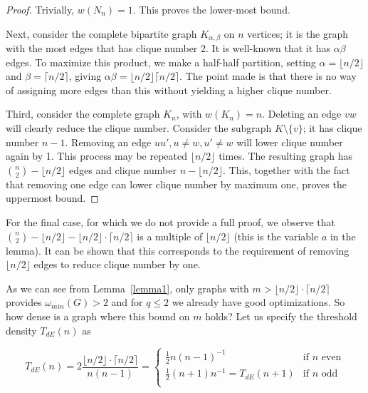\documentclass[a4paper]{article}
\begin{document}

\begin{proof}
 Trivially, $w(N_n) = 1$. This proves the lower-most bound.
 
 Next, consider the complete bipartite graph $K_{\alpha,\beta}$ on $n$ vertices; it is the graph with the most edges that has clique number 2. It is well-known that it has $\alpha \beta$ edges. To maximize this product, we make a half-half partition, setting $\alpha = \lfloor n / 2 \rfloor$ and $\beta = \lceil n / 2 \rceil$, giving $\alpha \beta = \lfloor n / 2 \rfloor \lceil n / 2 \rceil$. The point made is that there is no way of assigning more edges than this without yielding a higher clique number.
 
 Third, consider the complete graph $K_n$, with $w(K_n) = n$. Deleting an edge $vw$ will clearly reduce the clique number. Consider the subgraph $K \setminus \{v\}$; it has clique number $n - 1$. Removing an edge $uu', u \neq w, u' \neq w$ will lower clique number again by 1. This process may be repeated $\lfloor n / 2 \rfloor$ times. The resulting graph has $\binom{n}{2} - \lfloor n/2 \rfloor$ edges and clique number $n - \lfloor n/2 \rfloor$. This, together with the fact that removing one edge can lower clique number by maximum one, proves the uppermost bound. 
\end{proof}

For the final case, for which we do not provide a full proof, we observe that $\binom{n}{2} - \lfloor n/2 \rfloor - \lfloor n / 2 \rfloor \cdot \lceil n / 2 \rceil$ is a multiple of $\lfloor n/2 \rfloor$ (this is the variable $a$ in the lemma). It can be shown that this corresponds to the requirement of removing $\lfloor n/2 \rfloor$ edges to reduce clique number by one.

As we can see from Lemma~\ref{lemma1}, only graphs with $m > \lfloor n / 2 \rfloor \cdot \lceil n / 2 \rceil$ provides $\omega_{min}(G) > 2$ and for $q \leq 2$ we already have good optimizations. So how dense is a graph where this bound on $m$ holds? Let us specify the threshold density $T_{dE}(n)$ as

\[
T_{dE}(n) = 2\frac{\lfloor n / 2 \rfloor \cdot \lceil n / 2 \rceil}{n(n-1)} =
\begin{cases}
	  \frac{1}{2}n(n-1)^{-1} & \text{if } n \text{ even}\\
	  \frac{1}{2}(n+1)n^{-1} = T_{dE}(n+1) & \text{if } n \text{ odd}\\
\end{cases}
\]
\end{document}
